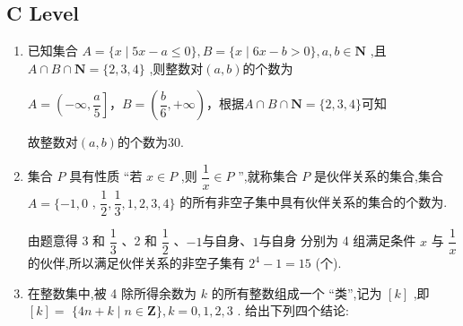 \subsection*{C Level}
\begin{enumerate}
    \item 已知集合 $A = \{ x \mid  {5x} - a \leq  0\} ,B = \{ x \mid  {6x} - b > 0\} ,a,b \in  \mathbf{N}$ ,且 $A \cap  B \cap  \mathbf{N} = \{ 2,3,4\}$ ,则整数对$(a, b)$的个数为
    \begin{jieda}
        $A = \left(-\infty, \dfrac{a}{5}\right]$，$B = \left(\dfrac{b}{6}, +\infty\right)$，根据$A \cap  B \cap  \mathbf{N} = \{ 2,3,4\}$可知
        \begin{dingautolist}{172}
            \item $4 \in A$，$5 \notin A$，故$\dfrac{a}{5} \in [4, 5)$，即$a \in \{20, 21, 22, 23, 24\}$
            \item $2 \in B$，$1 \notin B$，故$\dfrac{b}{6} \in [1,2)$，即$b \in \{6,7,8,9,10,11\}$
        \end{dingautolist}
        故整数对$(a, b)$的个数为$30$.
    \end{jieda}
    \item 集合 $P$ 具有性质 “若 $x \in  P$ ,则 $\dfrac{1}{x} \in  P$ ”,就称集合 $P$ 是伙伴关系的集合,集合 $A = \{  - 1,0$ , $\dfrac{1}{2},\dfrac{1}{3},1,2,3,4\}$ 的所有非空子集中具有伙伴关系的集合的个数为.
    \begin{jieda}
        由题意得 3 和 $\dfrac{1}{3}$ 、2 和 $\dfrac{1}{2}$ 、$-1$与自身、$1$与自身 分别为 4 组满足条件 $x$ 与 $\dfrac{1}{x}$ 的伙伴,所以满足伙伴关系的非空子集有 ${2}^{4} - 1 = {15}$ (个).
    \end{jieda}
    \item 在整数集中,被 4 除所得余数为 $k$ 的所有整数组成一个 “类”,记为 $\left\lbrack  k\right\rbrack$ ,即 $\left\lbrack  k\right\rbrack   =$  $\{ {4n} + k \mid  n \in  \mathbf{Z}\} ,k = 0,1,2,3$ . 给出下列四个结论:
\end{enumerate}
